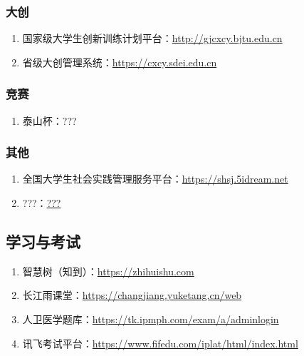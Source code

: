 \subsubsection[大创]{大创}
\begin{enumerate}
    \item 国家级大学生创新训练计划平台：\href{http://gjcxcy.bjtu.edu.cn}{http://gjcxcy.bjtu.edu.cn}
    \item 省级大创管理系统：\href{https://cxcy.sdei.edu.cn}{https://cxcy.sdei.edu.cn}
\end{enumerate}
\subsubsection[竞赛]{竞赛}
\begin{enumerate}
    \item 泰山杯：???
\end{enumerate}
\subsubsection[其他]{其他}
\begin{enumerate}
    \item 全国大学生社会实践管理服务平台：\href{https://shsj.5idream.net}{https://shsj.5idream.net}
    \item ???：\href{???}{???}
\end{enumerate}

\subsection[学习与考试]{学习与考试}
\begin{enumerate}
    \item 智慧树（知到）：\href{https://zhihuishu.com}{https://zhihuishu.com}
    \item 长江雨课堂：\href{https://changjiang.yuketang.cn/web}{https://changjiang.yuketang.cn/web}
    \item 人卫医学题库：\href{https://tk.ipmph.com/exam/a/adminlogin}{https://tk.ipmph.com/exam/a/adminlogin}
    \item 讯飞考试平台：\href{https://www.fifedu.com/iplat/html/index.html}{https://www.fifedu.com/iplat/html/index.html}
\end{enumerate}

